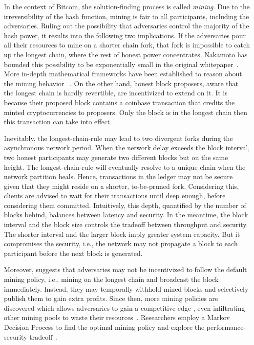 In the context of Bitcoin, the solution-finding process is called \textit{mining}. 
Due to the irreversibility of the hash function, mining is fair to all participants, including the adversaries. 
Ruling out the possibility that adversaries control the majority of the hash power, it results into the following two implications.
If the adversaries pour all their resources to mine on a shorter chain fork, 
that fork is impossible to catch up the longest chain, where the rest of honest power concentrates. 
Nakamoto has bounded this possibility to be exponentially small in the original whitepaper~\cite{nakamoto2019bitcoin}.
More in-depth mathematical frameworks have been established to reason about the mining behavior ~\cite{gervais2016security,kiayias2015speed,ren2019analysis,miller2014anonymous,garay2015bitcoin}. 
On the other hand, honest block proposers, aware that the longest chain is hardly revertible, are incentivized to extend on it. 
It is because their proposed block contains a coinbase transaction that credits the minted cryptocurrencies to proposers. 
Only the block is in the longest chain then this transaction can take into effect. 

Inevitably, the longest-chain-rule may lead to two divergent forks during the asynchronous network period. 
When the network delay exceeds the block interval, two honest participants may generate two different blocks but on the same height. 
The longest-chain-rule will eventually resolve to a unique chain when the network partition heals.
Hence, transactions in the ledger may not be secure given that they might reside on a shorter, to-be-pruned fork. 
Considering this, clients are advised to wait for their transactions until deep enough, before considering them committed. 
Intuitively, this depth, quantified by the number of blocks behind, balances between latency and security. 
In the meantime, the block interval and the block size controls the tradeoff between throughput and security. 
The shorter interval and the larger block imply greater system capacity. 
But it compromises the security, i.e., the network may not propagate a block to each participant before the next block is generated. 

Moreover, \cite{eyal2014majority} suggests that adversaries may not be incentivized to follow the default mining policy, i.e., mining on the longest chain and broadcast the block immediately. 
Instead, they may temporally withhold mined blocks and selectively publish them to gain extra profits.
Since then, more mining policies are discovered which allows adversaries to gain a competitive edge \cite{nayak2016stubborn,courtois2014subversive},
even infiltrating other mining pools to waste their resources~\cite{luu2015power,eyal2015miner}. 
Researchers employ a Markov Decision Process to find the optimal mining policy and explore the performance-security tradeoff~\cite{gervais2016security,sapirshtein2016optimal}.

